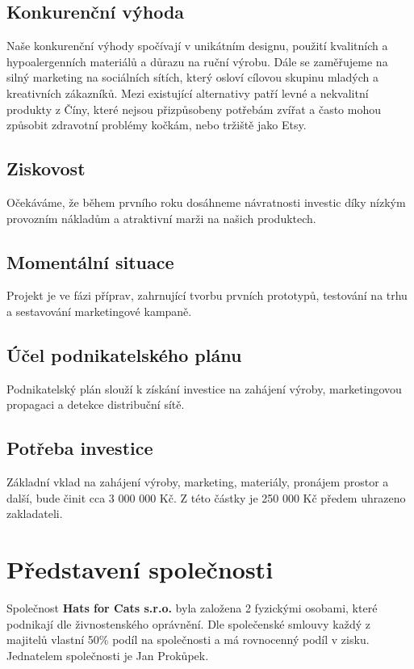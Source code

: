 \documentclass[12pt, a4paper]{article}
\begin{document}
\subsection{Konkurenční výhoda}
Naše konkurenční výhody spočívají v unikátním designu, použití kvalitních a hypoalergenních materiálů a důrazu na ruční výrobu. Dále se zaměřujeme na silný marketing na sociálních sítích, který osloví cílovou skupinu mladých a kreativních zákazníků.
Mezi existující alternativy patří levné a nekvalitní produkty z Číny, které nejsou přizpůsobeny potřebám zvířat a často mohou
způsobit zdravotní problémy kočkám, nebo tržiště jako Etsy.

\subsection{Ziskovost}
Očekáváme, že během prvního roku dosáhneme návratnosti investic díky 
nízkým provozním nákladům 
a atraktivní marži na našich produktech.

\subsection{Momentální situace}
Projekt je ve fázi příprav, zahrnující tvorbu prvních prototypů, 
testování na trhu a sestavování marketingové kampaně.

\subsection{Účel podnikatelského plánu}
Podnikatelský plán slouží k získání investice na zahájení výroby, 
marketingovou propagaci a detekce distribuční sítě.

\subsection{Potřeba investice}
Základní vklad na zahájení výroby, marketing, materiály,
pronájem prostor a další, bude činit cca 3 000 000 Kč.
Z této částky je 250 000 Kč předem uhrazeno zakladateli.

\section{Představení společnosti}
Společnost \textbf{Hats for Cats s.r.o.} byla založena 2 fyzickými osobami,
které podnikají dle živnostenského oprávnění. Dle společenské smlouvy
každý z majitelů vlastní 50\% podíl na společnosti a má rovnocenný podíl v zisku.
Jednatelem společnosti je Jan Prokůpek.
\end{document}
